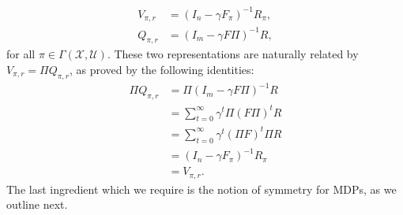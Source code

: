 \documentclass[10pt,leqno]{amsart}
\newcommand{\U}{\mathcal{U}}
\newcommand{\X}{\mathcal{X}}
\newcommand{\cost}{r}
\newcommand{\Vsym}{V}
\newcommand{\V}{\Vsym_{\policy, \cost}}
\newcommand{\Q}{Q_{\policy, \cost}}
\newcommand{\Cost}{R}
\newcommand{\Costfb}[1]{\Cost_{#1}}
\newcommand{\F}{F}
\newcommand{\Ffb}[1]{\F_{#1}}
\newcommand{\policy}{\pi}
\newcommand{\Sect}{\Gamma(\X, \U)}
\newcommand{\disc}{\gamma}
\begin{document}
\begin{align}\label{eq:value_reward_relation}
    \V &= (I_n - \disc \Ffb{\policy})^{-1} \Costfb{\policy},\\
    \Q &= (I_m - \disc \F\Pi)^{-1} \Cost,
\end{align}
for all $\policy \in \Sect$. These two representations are naturally related by $\V = \Pi \Q$, as proved by the following identities:
\begin{align*}
    \Pi \Q &= \Pi (I_m - \disc \F\Pi)^{-1} \Cost\\
    &= \sum_{t = 0}^\infty \disc^t \Pi(\F\Pi)^t \Cost\\
    &= \sum_{t = 0}^\infty \disc^t (\Pi\F)^t \Pi\Cost\\
    &= (I_n - \disc \Ffb{\policy})^{-1} \Costfb{\policy}\\
    &= \V.
\end{align*}
The last ingredient which we require is the notion of symmetry for MDPs, as we outline next.
\end{document}
